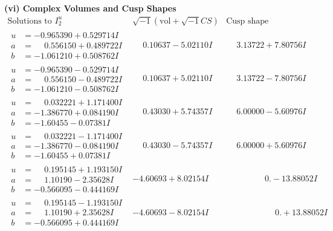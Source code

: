 \documentclass[1p]{elsarticle_modified}
\theoremstyle{definition}
\newcommand{\I}{\sqrt{-1}}
\begin{document}
\newpage\flushleft \textbf{(vi) Complex Volumes and Cusp Shapes}
$$\begin{array}{c|c|c}  
\text{Solutions to }I^u_{2}& \I (\text{vol} + \sqrt{-1}CS) & \text{Cusp shape}\\
 \hline 
\begin{aligned}
u &= -0.965390 + 0.529714 I \\
a &= \phantom{-}0.556150 + 0.489722 I \\
b &= -1.061210 + 0.508762 I\end{aligned}
 & \phantom{-}0.10637 - 5.02110 I & \phantom{-}3.13722 + 7.80756 I \\ \hline\begin{aligned}
u &= -0.965390 - 0.529714 I \\
a &= \phantom{-}0.556150 - 0.489722 I \\
b &= -1.061210 - 0.508762 I\end{aligned}
 & \phantom{-}0.10637 + 5.02110 I & \phantom{-}3.13722 - 7.80756 I \\ \hline\begin{aligned}
u &= \phantom{-}0.032221 + 1.171400 I \\
a &= -1.386770 + 0.084190 I \\
b &= -1.60455 - 0.07381 I\end{aligned}
 & \phantom{-}0.43030 + 5.74357 I & \phantom{-}6.00000 - 5.60976 I \\ \hline\begin{aligned}
u &= \phantom{-}0.032221 - 1.171400 I \\
a &= -1.386770 - 0.084190 I \\
b &= -1.60455 + 0.07381 I\end{aligned}
 & \phantom{-}0.43030 - 5.74357 I & \phantom{-}6.00000 + 5.60976 I \\ \hline\begin{aligned}
u &= \phantom{-}0.195145 + 1.193150 I \\
a &= \phantom{-}1.10190 - 2.35628 I \\
b &= -0.566095 - 0.444169 I\end{aligned}
 & -4.60693 + 8.02154 I & \phantom{-0.000000 } 0. - 13.88052 I \\ \hline\begin{aligned}
u &= \phantom{-}0.195145 - 1.193150 I \\
a &= \phantom{-}1.10190 + 2.35628 I \\
b &= -0.566095 + 0.444169 I\end{aligned}
 & -4.60693 - 8.02154 I & \phantom{-0.000000 -}0. + 13.88052 I \\ \hline\begin{aligned}

\end{aligned}
\end{array}$$
\end{document}
